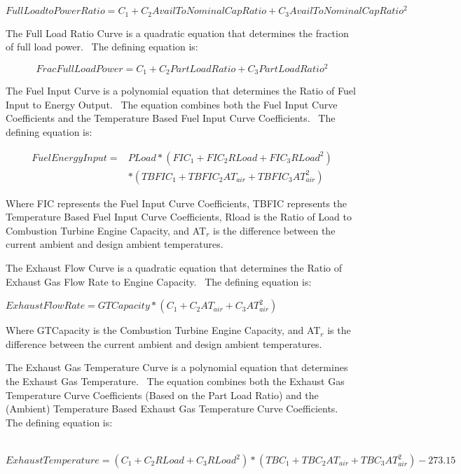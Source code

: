 \begin{equation}
FullLoadtoPowerRatio = {C_1} + {C_2}AvailToNominalCapRatio + {C_3}AvailToNominalCapRati{o^2}
\end{equation}

The Full Load Ratio Curve is a quadratic equation that determines the fraction of full load power.~ The defining equation is:

\begin{equation}
FracFullLoadPower = {C_1} + {C_2}PartLoadRatio + {C_3}PartLoadRati{o^2}
\end{equation}

The Fuel Input Curve is a polynomial equation that determines the Ratio of Fuel Input to Energy Output.~ The equation combines both the Fuel Input Curve Coefficients and the Temperature Based Fuel Input Curve Coefficients.~ The defining equation is:

\begin{equation}
\begin{split}
FuelEnergyInput =& PLoad * (FI{C_1} + FI{C_2}RLoad + FI{C_3}RLoa{d^2}) \\
&* (TBFI{C_1} + TBFI{C_2}A{T_{air}} + TBFI{C_3}AT_{air}^2)
\end{split}
\end{equation}

Where FIC represents the Fuel Input Curve Coefficients, TBFIC represents the Temperature Based Fuel Input Curve Coefficients, Rload is the Ratio of Load to Combustion Turbine Engine Capacity, and AT\(_{r}\) is the difference between the current ambient and design ambient temperatures.

The Exhaust Flow Curve is a quadratic equation that determines the Ratio of Exhaust Gas Flow Rate to Engine Capacity.~ The defining equation is:

\emph{\(ExhaustFlowRate = GTCapacity * ({C_1} + {C_2}A{T_{air}} + {C_3}AT_{air}^2)\) ~}

Where GTCapacity is the Combustion Turbine Engine Capacity, and AT\(_{r}\) is the difference between the current ambient and design ambient temperatures.

The Exhaust Gas Temperature Curve is a polynomial equation that determines the Exhaust Gas Temperature.~ The equation combines both the Exhaust Gas Temperature Curve Coefficients (Based on the Part Load Ratio) and the (Ambient) Temperature Based Exhaust Gas Temperature Curve Coefficients.~ The defining equation is:

~\(ExhaustTemperature = ({C_1} + {C_2}RLoad + {C_3}RLoa{d^2}) * (TB{C_1} + TB{C_2}A{T_{air}} + TB{C_3}AT_{air}^2) - 273.15\)

